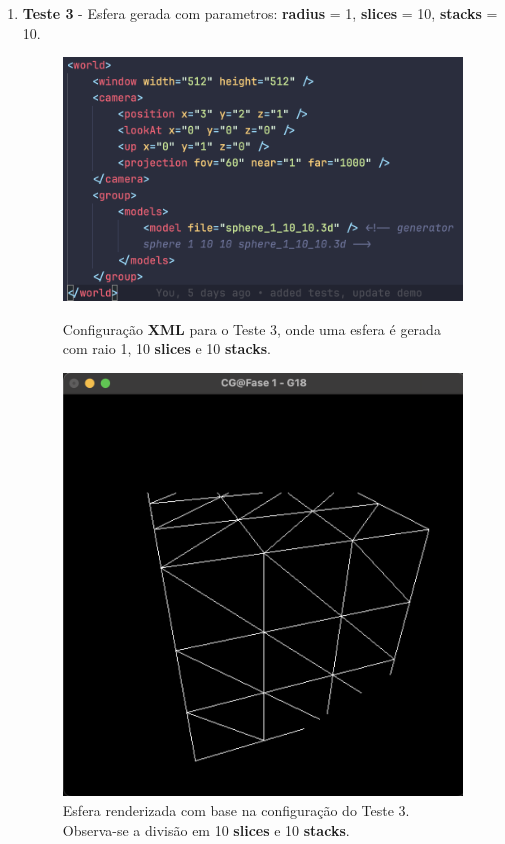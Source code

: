 \documentclass[12pt,a4paper]{report}%
\begin{document}
\begin{enumerate}
\item \textbf{Teste 3} - Esfera gerada com parametros: \textbf{radius} = 1, \textbf{slices} = 10, \textbf{stacks} = 10.  
    \begin{figure}[H]
    \centering
    \begin{minipage}{0.49\linewidth}
        \centering
        \includegraphics[width=\linewidth]{images/xmlTeste3.png}
        \caption[Teste 3 - XML]{Configuração \textbf{XML} para o Teste 3, onde uma esfera é gerada com raio 1, 10 \textbf{slices} e 10 \textbf{stacks}.}
        \label{fig:xml-teste3}
    \end{minipage}
    \hfill
    \begin{minipage}{0.49\linewidth}
        \centering
        \includegraphics[width=\linewidth]{images/Teste3.png}
        \caption[Teste 3 - Desenho]{Esfera renderizada com base na configuração do Teste 3. Observa-se a divisão em 10 \textbf{slices} e 10 \textbf{stacks}.}
        \label{fig:cena-teste3}
    \end{minipage}
\end{figure}


\end{enumerate}
\end{document}
